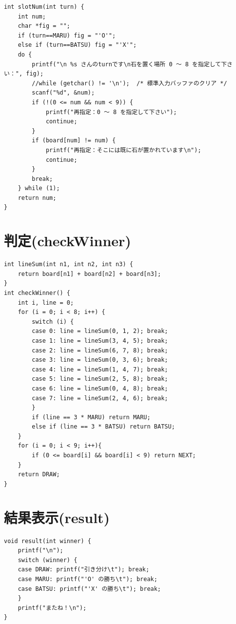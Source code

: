 \documentclass[uplatex,a4paper,11pt,oneside,openany]{jsbook}
\begin{document}
\begin{lstlisting}
int slotNum(int turn) {
    int num;
    char *fig = "";
    if (turn==MARU) fig = "'O'";
    else if (turn==BATSU) fig = "'X'";
    do {
        printf("\n %s さんのturnです\n石を置く場所 0 〜 8 を指定して下さい：", fig);
        //while (getchar() != '\n');  /* 標準入力バッファのクリア */
        scanf("%d", &num);
        if (!(0 <= num && num < 9)) {
            printf("再指定：0 〜 8 を指定して下さい");
            continue;
        }
        if (board[num] != num) {
            printf("再指定：そこには既に石が置かれています\n");
            continue;
        }
        break;
    } while (1);
    return num;
}
\end{lstlisting}

\section{判定(checkWinner)}

\begin{lstlisting}
int lineSum(int n1, int n2, int n3) {
    return board[n1] + board[n2] + board[n3];
}
int checkWinner() {
    int i, line = 0;
    for (i = 0; i < 8; i++) {
        switch (i) {
        case 0: line = lineSum(0, 1, 2); break;
        case 1: line = lineSum(3, 4, 5); break;
        case 2: line = lineSum(6, 7, 8); break;
        case 3: line = lineSum(0, 3, 6); break;
        case 4: line = lineSum(1, 4, 7); break;
        case 5: line = lineSum(2, 5, 8); break;
        case 6: line = lineSum(0, 4, 8); break;
        case 7: line = lineSum(2, 4, 6); break;
        }
        if (line == 3 * MARU) return MARU;
        else if (line == 3 * BATSU) return BATSU;
    }
    for (i = 0; i < 9; i++){
        if (0 <= board[i] && board[i] < 9) return NEXT;
    }
    return DRAW;
}
\end{lstlisting}

\newpage

\section{結果表示(result)}

\begin{lstlisting}
void result(int winner) {
    printf("\n");
    switch (winner) {
    case DRAW: printf("引き分け\t"); break;
    case MARU: printf("'O' の勝ち\t"); break;
    case BATSU: printf("'X' の勝ち\t"); break;
    }
    printf("またね！\n");
}
\end{lstlisting}
\end{document}
